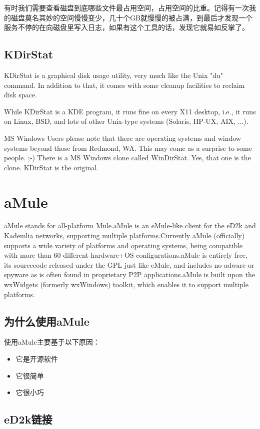 \documentclass[paper=a4,fontsize=11pt]{article}
\begin{document}
	有时我们需要查看磁盘到底哪些文件最占用空间，占用空间的比重。记得有一次我的磁盘莫名其妙的空间慢慢变少，几十个GB就慢慢的被占满，到最后才发现一个服务不停的在向磁盘里写入日志，如果有这个工具的话，发现它就易如反掌了。
	
	\subsection{KDirStat}
	KDirStat is a graphical disk usage utility, very much like the Unix "du" command. In addition to that, it comes with some cleanup facilities to reclaim disk space.
	
	While KDirStat is a KDE program, it runs fine on every X11 desktop, i.e., it runs on Linux, BSD, and lots of other Unix-type systems (Solaris, HP-UX, AIX, ...).
	
	MS Windows Users please note that there are operating systems and window systems beyond those from Redmond, WA. This may come as a surprise to some people. ;-) There is a MS Windows clone called WinDirStat. Yes, that one is the clone. KDirStat is the original.
			
	\section{aMule}
	aMule stands for all-platform Mule.aMule is an eMule-like client for the eD2k and Kademlia networks, supporting multiple platforms.Currently aMule (officially) supports a wide variety of platforms and operating systems, being compatible with more than 60 different hardware+OS configurations.aMule is entirely free, its sourcecode released under the GPL just like eMule, and includes no adware or spyware as is often found in proprietary P2P applications.aMule is built upon the wxWidgets (formerly wxWindows) toolkit, which enables it to support multiple platforms.
	\subsection{为什么使用aMule}
	使用aMule主要基于以下原因：
	\begin{itemize}
		\item{它是开源软件}
		\item{它很简单}
		\item{它很小巧}
	\end{itemize}
	
	\subsection{eD2k链接}
\end{document}
